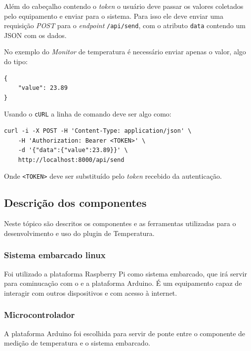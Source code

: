 Além do cabeçalho contendo o \emph{token} o usuário deve passar os
valores coletados pelo equipamento e enviar para o sistema. Para isso
ele deve enviar uma requisição \emph{POST} para o \emph{endpoint}
\texttt{/api/send}, com o atributo \texttt{data} contendo um JSON com os
dados.

No exemplo do \emph{Monitor} de temperatura é necessário enviar apenas o
valor, algo do tipo:

\begin{verbatim}
{
    "value": 23.89
}
\end{verbatim}

Usando o \texttt{cURL} a linha de comando deve ser algo como:

\begin{verbatim}
curl -i -X POST -H 'Content-Type: application/json' \
    -H 'Authorization: Bearer <TOKEN>' \
    -d '{"data":{"value":23.89}}' \
    http://localhost:8000/api/send
\end{verbatim}

Onde \texttt{\textless{}TOKEN\textgreater{}} deve ser substituído pelo
\emph{token} recebido da autenticação.

\subsection{Descrição dos
componentes}\label{descriuxe7uxe3o-dos-componentes}

Neste tópico são descritos os componentes e as ferramentas utilizadas
para o desenvolvimento e uso do plugin de Temperatura.

\subsubsection{Sistema embarcado linux}\label{sistema-embarcado-linux}

Foi utilizado a plataforma Raspberry Pi como sistema embarcado, que irá
servir para cominucação com o \wm e a plataforma Arduino. É um
equipamento \iot
capaz de interagir com outros dispositivos e com acesso à internet.

\subsubsection{Microcontrolador}\label{microcontrolador}

A plataforma Arduino foi escolhida para servir de ponte entre o
componente de medição de temperatura e o sistema embarcado.


